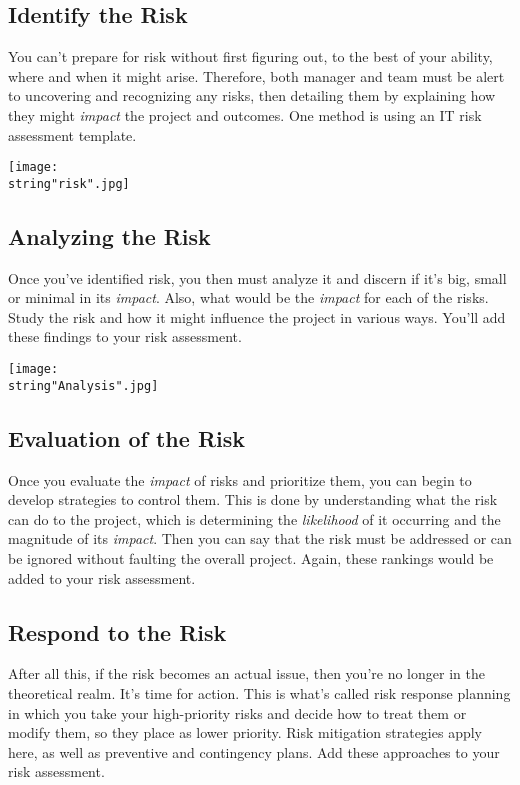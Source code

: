 \documentclass[a4paper,12pt]{article}
\begin{document}
\subsection{Identify the Risk}
You can’t prepare for risk without first figuring out, to the best of your ability, where and when it might arise. Therefore, both manager and team must be alert to uncovering and recognizing any risks, then detailing them by explaining how they might \emph{impact} the project and outcomes. One method is using an IT risk assessment template.


\begin{center}
\vspace*{\fill}\texttt{[image: \\string"risk".jpg]}\vspace*{\fill}
\par\end{center}



\subsection{Analyzing the Risk}
Once you’ve identified risk, you then must analyze it and discern if it’s big, small or minimal in its \emph{impact}. Also, what would be the \emph{impact} for each of the risks. Study the risk and how it might influence the project in various ways. You’ll add these findings to your risk assessment.



\begin{center}
\vspace*{\fill}\texttt{[image: \\string"Analysis".jpg]}\vspace*{\fill}
\par\end{center}

\subsection{Evaluation of the Risk}
Once you evaluate the \emph{impact} of risks and prioritize them, you can begin to develop strategies to control them. This is done by understanding what the risk can do to the project, which is determining the \emph{likelihood} of it occurring and the magnitude of its \emph{impact}. Then you can say that the risk must be addressed or can be ignored without faulting the overall project. Again, these rankings would be added to your risk assessment.


\subsection{Respond to the Risk}
After all this, if the risk becomes an actual issue, then you’re no longer in the theoretical realm. It’s time for action. This is what’s called risk response planning in which you take your high-priority risks and decide how to treat them or modify them, so they place as lower priority. Risk mitigation strategies apply here, as well as preventive and contingency plans. Add these approaches to your risk assessment.
\end{document}
